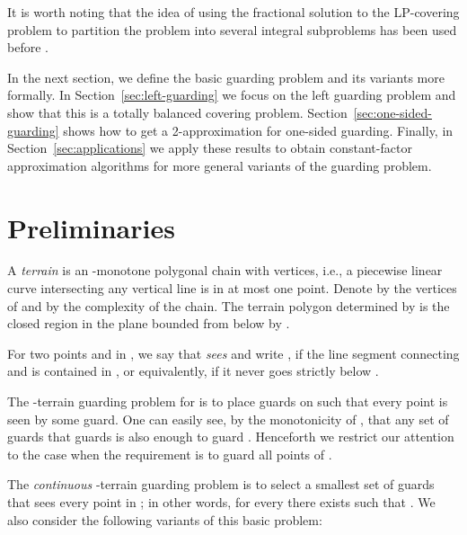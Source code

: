 \documentclass[11pt]{article}
\begin{document}
It is worth noting that the idea of using the fractional solution to the
LP-covering problem to partition the problem into several integral subproblems
has been used before
\cite{journals/orl/HassinS08,conf/stacs/Mestre08,journals/jal/GaurIK02}.

In the next section, we
define the basic guarding problem and its variants
more formally. In Section~\ref{sec:left-guarding} we focus on the left
guarding problem and show that this is a totally balanced covering problem.
Section~\ref{sec:one-sided-guarding} shows how to get a 2-approximation for
one-sided guarding. Finally, in Section~\ref{sec:applications} we apply these
results to obtain constant-factor approximation algorithms for more general variants of
the guarding problem.

\section{Preliminaries}
\label{sec:preliminaries}


A \emph{terrain}  is an -monotone polygonal chain with  vertices,
i.e., a piecewise linear curve intersecting any vertical line is in at most
one point. Denote by  the vertices of  and by  the complexity of
the chain. The terrain polygon  determined by  is the closed region in
the plane bounded from below by .

For two points  and  in , we say that  \emph{sees}  and
write , if the line segment connecting  and  is contained
in , or equivalently, if it never goes strictly below .

The -terrain guarding problem for  is to place guards on  such
that every point  is seen by some guard. One can easily see, by the
monotonicity of , that any set of guards that guards  is also enough to
guard . Henceforth we restrict our attention to the case when the
requirement is to guard all points of .

The \emph{continuous} -terrain guarding problem is to select a smallest
set of guards  that sees every point in ; in other words,
for every  there exists  such that . We also
consider the following variants of this basic problem:
\end{document}
